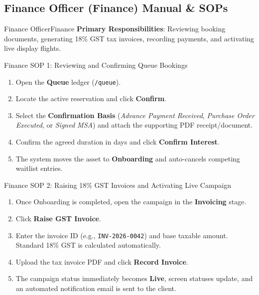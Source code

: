 \documentclass[11pt,a4paper]{article}
\begin{document}
\subsection{Finance Officer (Finance) Manual \& SOPs}

\begin{rolebox}{Finance Officer}{Finance}
\textbf{Primary Responsibilities}: Reviewing booking documents, generating 18\% GST tax invoices, recording payments, and activating live display flights.
\end{rolebox}

\begin{sopbox}{Finance SOP 1: Reviewing and Confirming Queue Bookings}
\begin{enumerate}[leftmargin=1.2em, itemsep=2pt]
    \item Open the \textbf{Queue} ledger (\texttt{/queue}).
    \item Locate the active reservation and click \textbf{Confirm}.
    \item Select the \textbf{Confirmation Basis} (\textit{Advance Payment Received}, \textit{Purchase Order Executed}, or \textit{Signed MSA}) and attach the supporting PDF receipt/document.
    \item Confirm the agreed duration in days and click \textbf{Confirm Interest}.
    \item The system moves the asset to \textbf{Onboarding} and auto-cancels competing waitlist entries.
\end{enumerate}
\end{sopbox}

\begin{sopbox}{Finance SOP 2: Raising 18\% GST Invoices and Activating Live Campaign}
\begin{enumerate}[leftmargin=1.2em, itemsep=2pt]
    \item Once Onboarding is completed, open the campaign in the \textbf{Invoicing} stage.
    \item Click \textbf{Raise GST Invoice}.
    \item Enter the invoice ID (e.g., \texttt{INV-2026-0042}) and base taxable amount. Standard 18\% GST is calculated automatically.
    \item Upload the tax invoice PDF and click \textbf{Record Invoice}.
    \item The campaign status immediately becomes \textbf{Live}, screen statuses update, and an automated notification email is sent to the client.
\end{enumerate}
\end{sopbox}
\end{document}
